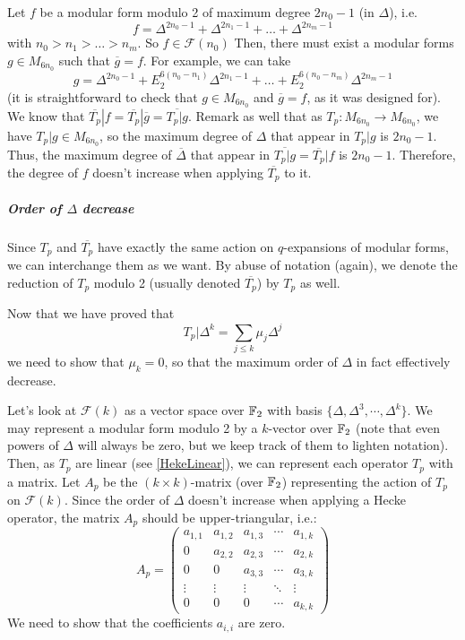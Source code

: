 Let $f$ be a modular form modulo 2 of maximum degree $2n_0-1$ (in $\Delta$), i.e. 
$$
f = \Delta^{2n_0-1} + \Delta^{2n_1-1} + \dots + \Delta^{2n_m-1}
$$ with $n_0 > n_1 > \dots > n_m$.
So $f \in \mathcal{F}(n_0)$
Then, there must exist a modular forms $g \in M_{6n_0}$ such that $\overline{g}=f$.
For example, we can take 
$$
g = \Delta^{2n_0-1} + E_2^{6(n_0-n_1)}\Delta^{2n_1-1} + \dots + E_2^{6(n_0-n_m)}\Delta^{2n_m-1}
$$
(it is straightforward to check that $g\in M_{6n_0}$ and $\overline{g}=f$, as it was designed for).
We know that $\overline{T_p}|f = \overline{T_p}|\overline{g} = \overline{T_p|g}$.
Remark as well that as $T_p: M_{6n_0} \to M_{6n_0}$, we have $T_p|g \in M_{6n_0}$, so the maximum degree of $\Delta$ that appear in $T_p|g$ is $2n_0-1$.
Thus, the maximum degree of $\overline{\Delta}$ that appear in $\overline{T_p|g} = \overline{T_p}|f$ is $2n_0-1$.
Therefore, the degree of $f$ doesn't increase when applying $\overline{T_p}$ to it.



\subparagraph{Order of $\Delta$ decrease}
\label{orderDecrease}
Since $T_p$ and $\overline{T_p}$ have exactly the same action on $q$-expansions of modular forms, we can interchange them as we want.
By abuse of notation (again), we denote the reduction of $T_p$ modulo 2 (usually denoted $\overline{T_p}$) by $T_p$ as well.

Now that we have proved that 
$$
T_p| \Delta^k = \sum_{j \leq k} \mu_j \Delta^j
$$
we need to show that $\mu_k = 0$, so that the maximum order of $\Delta$ in fact effectively decrease.

Let's look at $\mathcal{F}(k)$ as a vector space over $\mathbb{F}_2$ with basis $\{ \Delta, \Delta^3, \cdots, \Delta^k \}$.
We may represent a modular form modulo 2 by a $k$-vector over $\mathbb{F}_2$ (note that even powers of $\Delta$ will always be zero, but we keep track of them to lighten notation).
Then, as $T_p$ are linear (see \ref{HekeLinear}), we can represent each operator $T_p$ with a matrix.
Let $A_p$ be the $(k \times k)$-matrix (over $\mathbb{F}_2$) representing the action of $T_p$ on $\mathcal{F}(k)$.
Since the order of $\Delta$ doesn't increase when applying a Hecke operator, the matrix $A_p$ should be upper-triangular, i.e.:
$$
A_p = 
\begin{pmatrix}
a_{1,1} & a_{1,2} & a_{1,3} & \cdots & a_{1,k} \\
   0    & a_{2,2} & a_{2,3} & \cdots & a_{2,k} \\
   0    &    0    & a_{3,3} & \cdots & a_{3,k} \\
\vdots  & \vdots  & \vdots  & \ddots & \vdots  \\
   0    &    0    &    0    & \cdots & a_{k,k}
\end{pmatrix}
$$
We need to show that the coefficients $a_{i,i}$ are zero.

